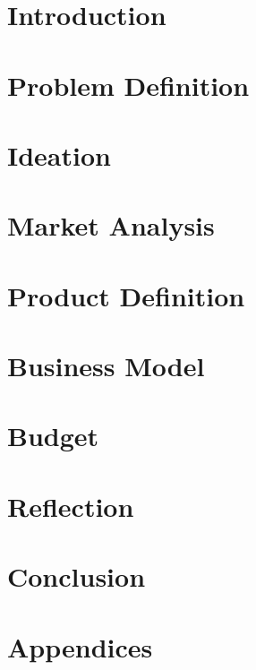 \documentclass[11pt, a4paper]{article}
\begin{document}
\begin{multicols}{2}
	



\section{Introduction}
\label{sec:intro}


\section{Problem Definition}
\label{sec:problemDefinition}


\section{Ideation}
\label{sec:ideation}


\section{Market Analysis}
\label{sec:marketanlysis}


\section{Product Definition}
\label{sec:productDefinition}


\section{Business Model}
\label{sec:businessModel}


\section{Budget}
\label{sec:budget}


\section{Reflection}
\label{sec:reflection}


\section{Conclusion}
\label{sec:conclusion}


\newpage



\listoftables
\listoffigures

\end{multicols}
\label{end}
\newpage
\section*{\Huge{Appendices}}

\end{document}
